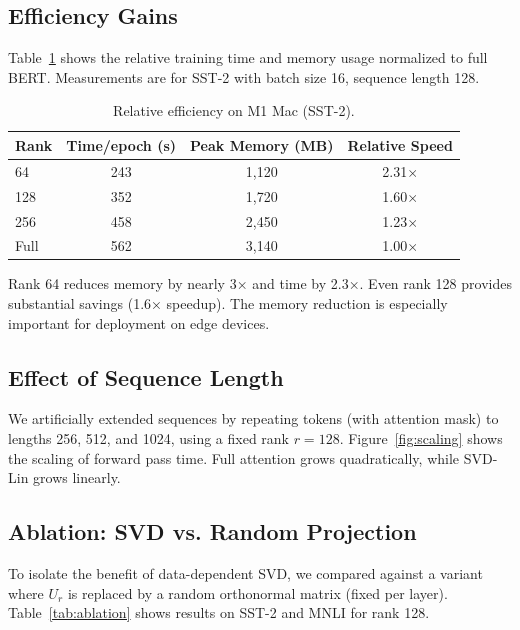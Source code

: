 \documentclass[twocolumn]{article}
\begin{document}
\subsection{Efficiency Gains}
Table~\ref{tab:efficiency} shows the relative training time and memory usage normalized to full BERT. Measurements are for SST-2 with batch size 16, sequence length 128.

\begin{table}[h]
\centering
\caption{Relative efficiency on M1 Mac (SST-2).}
\label{tab:efficiency}
\begin{tabular}{lccc}
\toprule
\textbf{Rank} & \textbf{Time/epoch (s)} & \textbf{Peak Memory (MB)} & \textbf{Relative Speed} \\
\midrule
64   & 243 & 1,120 & 2.31$\times$ \\
128  & 352 & 1,720 & 1.60$\times$ \\
256  & 458 & 2,450 & 1.23$\times$ \\
Full & 562 & 3,140 & 1.00$\times$ \\
\bottomrule
\end{tabular}
\end{table}

Rank 64 reduces memory by nearly 3× and time by 2.3×. Even rank 128 provides substantial savings (1.6× speedup). The memory reduction is especially important for deployment on edge devices.

\subsection{Effect of Sequence Length}
We artificially extended sequences by repeating tokens (with attention mask) to lengths 256, 512, and 1024, using a fixed rank $r=128$. Figure~\ref{fig:scaling} shows the scaling of forward pass time. Full attention grows quadratically, while SVD-Lin grows linearly.


\subsection{Ablation: SVD vs. Random Projection}
To isolate the benefit of data-dependent SVD, we compared against a variant where $U_r$ is replaced by a random orthonormal matrix (fixed per layer). Table~\ref{tab:ablation} shows results on SST-2 and MNLI for rank 128.
\end{document}
